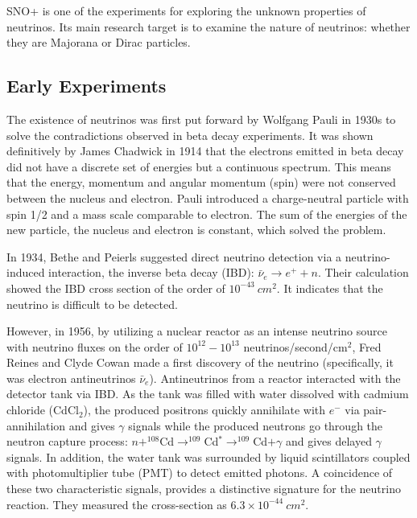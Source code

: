 \documentclass[preprint,12pt]{elsarticle}
\numberwithin{equation}{section}
\begin{document}
SNO+ is one of the experiments for exploring the unknown properties of neutrinos. Its main research target is to examine the nature of neutrinos: whether they are Majorana or Dirac particles.

\subsection{Early Experiments}
The existence of neutrinos was first put forward by Wolfgang Pauli in 1930s to solve the contradictions observed in beta decay experiments. It was shown definitively by James Chadwick in 1914 that the electrons emitted in beta decay did not have a discrete set of energies but a continuous spectrum\cite{cowanexpintro}. This means that the energy, momentum and angular momentum (spin) were not conserved between the nucleus and electron. Pauli introduced a charge-neutral particle with spin 1/2 and a mass scale comparable to electron. The sum of the energies of the new particle, the nucleus and electron is constant, which solved the problem. 

In 1934, Bethe and Peierls suggested direct neutrino detection via a neutrino-induced interaction, the inverse beta decay (IBD): $\bar{\nu}_e\to e^+ + n$. Their calculation showed the IBD cross section of the order of $10^{-43}~cm^2$. It indicates that the neutrino is difficult to be detected\cite{bethe1}.
 
However, in 1956, by utilizing a nuclear reactor as an intense neutrino source with neutrino fluxes on the order of $10^{12}-10^{13}$ neutrinos/second/cm$^2$, Fred Reines and Clyde Cowan made a first discovery of the neutrino (specifically, it was electron antineutrinos $\bar{\nu}_e$). Antineutrinos from a reactor interacted with the detector tank via IBD. As the tank was filled with water dissolved with cadmium chloride (CdCl$_2$), the produced positrons quickly annihilate with $e^-$ via pair-annihilation and gives $\gamma$ signals while the produced neutrons go through the neutron capture process: \noindent$n+^{108}$Cd$\to ^{109}$Cd$^*\to ^{109}$Cd$ +\gamma$ and gives delayed $\gamma$ signals. In addition, the water tank was surrounded by liquid scintillators coupled with photomultiplier tube (PMT) to detect emitted photons. A coincidence of these two characteristic signals, provides a distinctive signature for the neutrino reaction. They measured the cross-section as $6.3\times10^{-44}~cm^2$.
\end{document}
